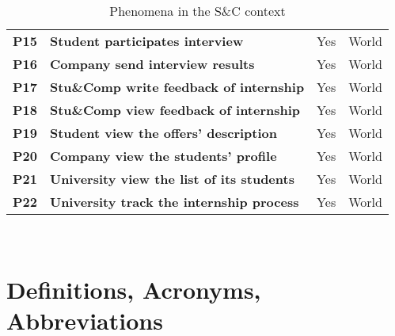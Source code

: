 \begin{table}[H]
\begin{tabular}{|c|p{20em}|c|c|}
    \textbf{P15} & \textbf{Student participates interview} & Yes & World \T\B \\
    \textbf{P16} & \textbf{Company send interview results} & Yes & World \B\\
    \textbf{P17} & \textbf{Stu\&Comp write feedback of internship} & Yes & World \T\B\\
    \textbf{P18} & \textbf{Stu\&Comp view feedback of internship} & Yes & World \B\\
    \textbf{P19} & \textbf{Student view the offers' description} & Yes & World \T\B \\
    \textbf{P20} & \textbf{Company view the students' profile} & Yes & World \T\B\\
    \textbf{P21} & \textbf{University view the list of its students} & Yes & World \B\\
    \textbf{P22} & \textbf{University track the internship process} & Yes & World \T\B\\
    \hline
    \end{tabular}
    \\[10pt]
    \caption{Phenomena in the S\&C context}
    \label{table:phenomena}
\end{table}

\section{Definitions, Acronyms, Abbreviations}
\label{sec:definitions}
